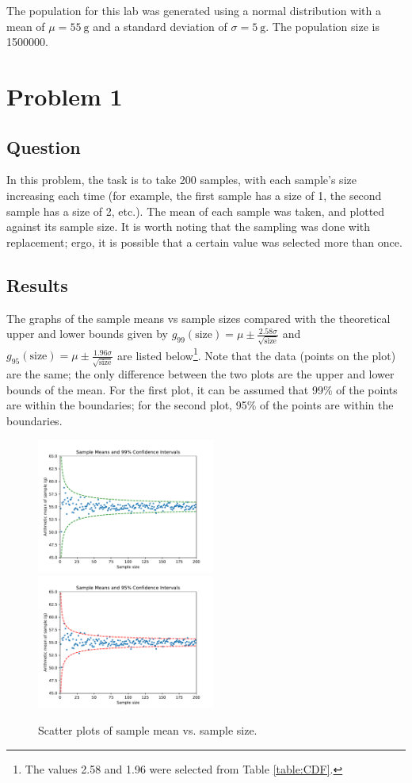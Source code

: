 \documentclass{article}
\begin{document}
The population for this lab was generated using a normal
distribution with a mean of \(\mu = \SI{55}{\gram}\) and a
standard deviation of \(\sigma = \SI{5}{\gram}\). The population
size is \num{1500000}.

\section{Problem 1}
\subsection{Question} In this problem, the task is to take
200 samples, with each sample's size increasing each time
(for example, the first sample has a size of 1, the second
sample has a size of 2, etc.). The mean of each sample was taken,
and plotted against its sample size. It is worth noting that
the sampling was done with replacement; ergo, it is possible
that a certain value was selected more than once.

\subsection{Results} The graphs of the sample means vs sample
sizes compared with the theoretical upper and lower bounds
given by \(g_{99}(\text{size}) = \mu \pm \frac{2.58\sigma}{\sqrt{\text{size}}} \)
and \(g_{95}(\text{size}) = \mu \pm \frac{1.96\sigma}{\sqrt{\text{size}}} \)
are listed below\footnote{The values 2.58 and 1.96 were
selected from Table \ref{table:CDF}.}. Note that the
data (points on the plot) are the same; the only difference
between the two plots are the upper and lower bounds of the mean.
For the first plot, it can be assumed that 99\% of the points
are within the boundaries; for the second plot, 95\% of the
points are within the boundaries.

\begin{figure}[H]
    \centering
    \includegraphics[height=125pt]{Images/Figure2} \includegraphics[height=125pt]{Images/Figure1}
    \caption{Scatter plots of sample mean vs. sample size.}
    \label{Prob1:plots}
\end{figure}
\end{document}
